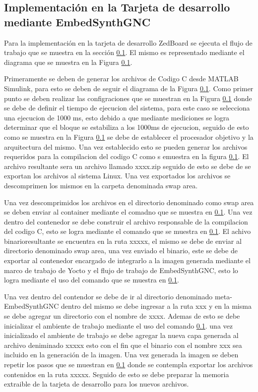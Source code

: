 \subsection{Implementación en la Tarjeta de desarrollo mediante EmbedSynthGNC}

Para la implementación en la tarjeta de desarrollo ZedBoard se ejecuta el flujo de trabajo que se muestra en la sección \ref{}. El mismo es representado mediante el diagrama que se muestra en la Figura \ref{}.

Primeramente se deben de generar los archivos de Codigo C desde MATLAB Simulink, para esto se deben de seguir el diagrama de la Figura \ref{}. Como primer punto se deben realizar las configraciones que se muestran en la Figura \ref{} donde se debe de definir el tiempo de ejecucion del sistema, para este caso se selecciona una ejecucion de 1000 ms, esto debido a que mediante mediciones se logra determinar que el bloque se estabiliza a los 1000ms de ejecucion, seguido de esto como se muestra en la Figura \ref{} se debe de establecer el procesador objetivo y la arquitectura del mismo. Una vez establecido esto se pueden generar los archivos requeridos para la compilacion del codigo C como s emuestra en la figura \ref{}. El archivo resultante sera un archivo llamado xxxx.zip seguido de esto se debe de  se exportan los archivos al sistema Linux. Una vez exportados los archivos se descomprimen los mismos en la carpeta denominada swap area.

Una vez descomprimidos los archivos en el directorio denominado como swap area se deben enviar al container mediante el comadno que se muestra en \ref{}. Una vez dentro del contenedor se debe construir el archivo responsable de la compilacion del codigo C, esto se logra mediante el comando que se muestra en \ref{}. El achivo binarioresultante se encuentra en la ruta xxxxx, el mismo se debe de enviar al directorio denominado swap area, una vez enviado el binario, este se debe de exportar al contenedor encargado de integrarlo a la imagen generada mediante el marco de trabajo de Yocto y el flujo de trabajo de EmbedSynthGNC, esto lo logra mediante el uso del comando que se muestra en \ref{}. 


Una vez dentro del contendor se debe de ir al directorio denominado meta-EmbedSynthGNC dentro del mismo se debe ingresar a la ruta xxx y en la misma se debe agregar un directorio con el nombre de xxxx. Ademas de esto se debe inicializar el ambiente de trabajo mediante el uso del comando \ref{}. una vez inicializado el ambiente de trabajo se debe agregar la nueva capa generada al archivo deniminado xxxxx esto con el fin que el binario con el nombre xxx sea incluido en la generación de la imagen. Una vez generada la imagen se deben repetir los pasos que se muestran en \ref{} donde se contempla exportar los archivos contenidos en la ruta xxxxx. Seguido de esto se debe preparar la memoria extraible de la tarjeta de desarrollo para los nuevos archivos. 


